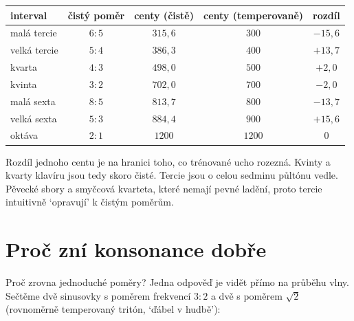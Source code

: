 \begin{center}
  \begin{tabular}{|l|c|c|c|c|}
    \hline
    interval & čistý poměr & centy (čistě) & centy (temperovaně) & rozdíl\\
    \hline
    malá tercie & $6:5$ & $315{,}6$ & $300$ & $-15{,}6$\\
    velká tercie & $5:4$ & $386{,}3$ & $400$ & $+13{,}7$\\
    kvarta & $4:3$ & $498{,}0$ & $500$ & $+2{,}0$\\
    kvinta & $3:2$ & $702{,}0$ & $700$ & $-2{,}0$\\
    malá sexta & $8:5$ & $813{,}7$ & $800$ & $-13{,}7$\\
    velká sexta & $5:3$ & $884{,}4$ & $900$ & $+15{,}6$\\
    oktáva & $2:1$ & $1200$ & $1200$ & $0$\\
    \hline
  \end{tabular}
\end{center}

Rozdíl jednoho centu je na hranici toho, co trénované ucho rozezná. Kvinty a kvarty klavíru jsou tedy skoro čisté. Tercie jsou o celou sedminu půltónu vedle. Pěvecké sbory a smyčcová kvarteta, které nemají pevné ladění, proto tercie intuitivně `opravují' k čistým poměrům.

\section{Proč zní konsonance dobře}

Proč zrovna jednoduché poměry? Jedna odpověď je vidět přímo na průběhu vlny. Sečtěme dvě sinusovky s poměrem frekvencí $3:2$ a dvě s poměrem $\sqrt{2}$ (rovnoměrně temperovaný tritón, `ďábel v hudbě'):

\begin{center}
\end{center}

